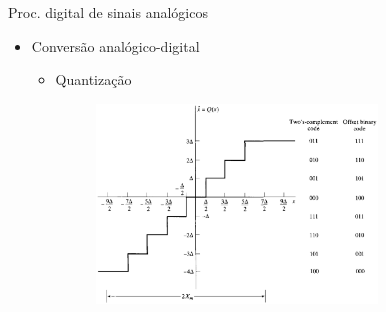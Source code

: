 \documentclass[
size=11pt,
paper=screen,
mode=present,
display=slidesnotes,
style=paintings,
nopagebreaks,
blackslide,
fleqn]{powerdot}
\begin{document}
\begin{slide}{Proc. digital de sinais anal\'ogicos}
\begin{itemize}
   \item Conversão analógico-digital
   \begin{itemize}
      \item Quantização 
      \begin{figure}
        \centering
         \includegraphics[width = 0.75\textwidth]{figs/ad_quantz.eps}
      \end{figure}

   \end{itemize}
\end{itemize}
\end{slide}
\end{document}
